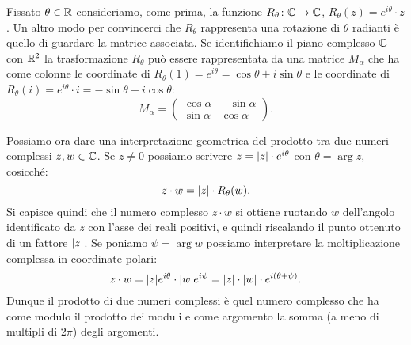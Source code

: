 \begin{remark}
Fissato $\theta\in {\mathbb R}$
consideriamo, come prima, la funzione $R_\theta\colon {\mathbb C} \to {\mathbb C}$,
$R_\theta(z) = e^{i\theta}\cdot z$.
Un altro modo per convincerci che $R_\theta$
rappresenta una rotazione di $\theta$ radianti è
quello di guardare la matrice associata.
Se identifichiamo il piano complesso ${\mathbb C}$ con ${\mathbb R}^2$ la trasformazione
$R_\theta$ può essere rappresentata
da una matrice $M_\alpha$ che ha come
colonne le coordinate di $R_\theta(1) = e^{i\theta} = \cos \theta + i \sin \theta$
e le coordinate di $R_\theta(i) = e^{i\theta}\cdot i = -\sin \theta + i \cos \theta$:
\[
  M_\alpha =
  \begin{pmatrix}
  \cos \alpha & -\sin \alpha \\
  \sin \alpha & \cos \alpha
  \end{pmatrix}.
\]
\end{remark}

\begin{remark}
Possiamo ora dare una interpretazione geometrica del prodotto tra
due numeri complessi $z,w\in {\mathbb C}$.
Se $z\neq 0$ possiamo scrivere $z = {\left|z\right|} \cdot e^{i\theta}$
con $\theta= \arg z$, cosicché:
\[
  z \cdot w = {\left|z\right|} \cdot R_\theta(w).
\]
Si capisce quindi che il numero complesso $z\cdot w$ si ottiene ruotando
$w$ dell'angolo identificato da $z$ con l'asse dei reali positivi, e quindi
riscalando il punto ottenuto di un fattore ${\left|z\right|}$.
Se poniamo $\psi = \arg w$ possiamo interpretare la moltiplicazione complessa
in coordinate polari:
\[
  z \cdot w = {\left|z\right|}e^{i\theta}\cdot {\left|w\right|} e^{i\psi}
   = {\left|z\right|} \cdot {\left|w\right|} \cdot e^{i(\theta + \psi)}.
\]
Dunque il prodotto di due numeri complessi è quel numero complesso
che ha come modulo il prodotto dei moduli e come argomento
la somma (a meno di multipli di $2\pi$) degli argomenti.
\end{remark}


